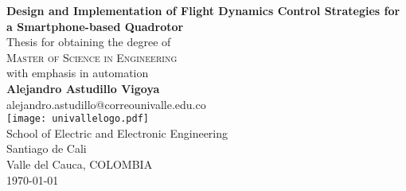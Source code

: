 \begin{titlepage}
\begin{center}
 {\LARGE\bfseries Design and Implementation of Flight Dynamics Control Strategies for a Smartphone-based Quadrotor\\}
 \vspace{2.5cm}
{Thesis for obtaining the degree of} \\[2cm]
\textsc{\Large{{Master of Science in Engineering}}} \\[5pt]
{with emphasis in automation} \\[2pt]
 \vfill
 \vspace{0.5cm}
 \vspace{1.5cm}
 {\Large\bfseries Alejandro Astudillo Vigoya}\\[5pt]
 alejandro.astudillo@correounivalle.edu.co\\[14pt]
 \vspace{1.5cm}
\texttt{[image: univallelogo.pdf]}\\[5pt]
{School of Electric and Electronic Engineering}\\[5pt]
{Santiago de Cali}\\[5pt]
{Valle del Cauca,
 COLOMBIA}\\
 \vfill
 \vspace{0.2cm}
{\today} %
\end{center}
\end{titlepage}